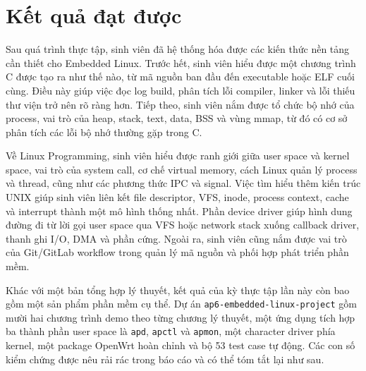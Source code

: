 \documentclass[11pt]{article}
\newcommand{\code}[1]{\texttt{#1}}
\begin{document}
\section{Kết quả đạt được}

Sau quá trình thực tập, sinh viên đã hệ thống hóa được các kiến thức nền tảng cần thiết cho Embedded Linux. Trước hết, sinh viên hiểu được một chương trình C được tạo ra như thế nào, từ mã nguồn ban đầu đến executable hoặc ELF cuối cùng. Điều này giúp việc đọc log build, phân tích lỗi compiler, linker và lỗi thiếu thư viện trở nên rõ ràng hơn. Tiếp theo, sinh viên nắm được tổ chức bộ nhớ của process, vai trò của heap, stack, text, data, BSS và vùng mmap, từ đó có cơ sở phân tích các lỗi bộ nhớ thường gặp trong C.

Về Linux Programming, sinh viên hiểu được ranh giới giữa user space và kernel space, vai trò của system call, cơ chế virtual memory, cách Linux quản lý process và thread, cũng như các phương thức IPC và signal. Việc tìm hiểu thêm kiến trúc UNIX giúp sinh viên liên kết file descriptor, VFS, inode, process context, cache và interrupt thành một mô hình thống nhất. Phần device driver giúp hình dung đường đi từ lời gọi user space qua VFS hoặc network stack xuống callback driver, thanh ghi I/O, DMA và phần cứng. Ngoài ra, sinh viên cũng nắm được vai trò của Git/GitLab workflow trong quản lý mã nguồn và phối hợp phát triển phần mềm.

Khác với một bản tổng hợp lý thuyết, kết quả của kỳ thực tập lần này còn bao gồm một sản phẩm phần mềm cụ thể. Dự án \code{ap6-embedded-linux-project} gồm mười hai chương trình demo theo từng chương lý thuyết, một ứng dụng tích hợp ba thành phần user space là \code{apd}, \code{apctl} và \code{apmon}, một character driver phía kernel, một package OpenWrt hoàn chỉnh và bộ 53 test case tự động. Các con số kiểm chứng được nêu rải rác trong báo cáo và có thể tóm tắt lại như sau.
\end{document}
